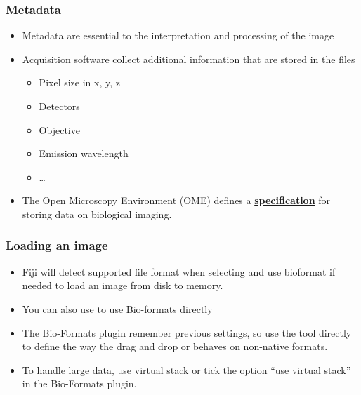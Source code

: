 \documentclass[ignorenonframetext,aspectratio=169,10pt,xcolor=table]{beamer}
\begin{document}
\begin{frame} \frametitle{Metadata}

  \begin{itemize} \setlength\itemsep{1em}
    \item Metadata are essential to the interpretation and processing of
          the image
    \item Acquisition software collect additional information that are
          stored in the files
          \begin{itemize}
            \item Pixel size in x, y, z
            \item Detectors
            \item Objective
            \item Emission wavelength
            \item \dots
          \end{itemize}
    \item The Open Microscopy Environment (OME) defines a \textbf{\href{http://www.openmicroscopy.org/Schemas/OME/2016-06}{specification}}
          for storing data on biological imaging.
  \end{itemize}


\end{frame}

\begin{frame} \frametitle{Loading an image}
  \begin{itemize} \setlength\itemsep{2em}
    \item Fiji will detect supported file format when selecting
           and use bioformat if needed to load an image from
          disk to memory.
    \item You can also use  to use Bio-formats directly
    \item The Bio-Formats plugin remember previous settings, so use
          the tool directly to define the way the drag and drop or
           behaves on non-native formats.
    \item To handle large data, use virtual stack  or tick the option ``use virtual stack'' in the Bio-Formats plugin.
  \end{itemize}
\end{frame}
\end{document}
